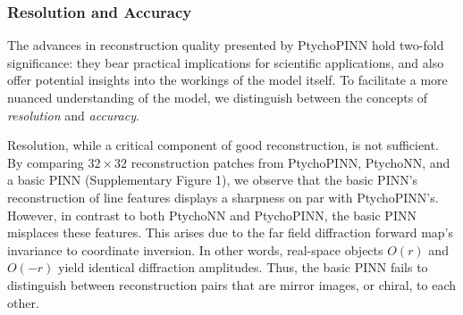 \documentclass[sn-mathphys]{sn-jnl}%
\theoremstyle{thmstyleone}%
\theoremstyle{thmstyletwo}%
\theoremstyle{thmstylethree}%
\begin{document}
\subsubsection{Resolution and Accuracy}


 The advances in reconstruction quality presented by PtychoPINN hold two-fold significance: they bear practical implications for scientific applications, and also offer potential insights into the workings of the model itself. To facilitate a more nuanced understanding of the model, we distinguish between the concepts of \emph{resolution} and \emph{accuracy}.

Resolution, while a critical component of good reconstruction, is not sufficient. By comparing $32 \times 32$ reconstruction patches from PtychoPINN, PtychoNN, and a basic PINN (Supplementary Figure 1), we observe that the basic PINN's reconstruction of line features displays a sharpness on par with PtychoPINN's. However, in contrast to both PtychoNN and PtychoPINN, the basic PINN misplaces these features. This arises due to the far field diffraction forward map's invariance to coordinate inversion.  In other words, real-space objects $O(r)$ and $O(-r)$ yield identical diffraction amplitudes. Thus, the basic PINN fails to distinguish between reconstruction pairs that are mirror images, or chiral, to each other.




\end{document}
